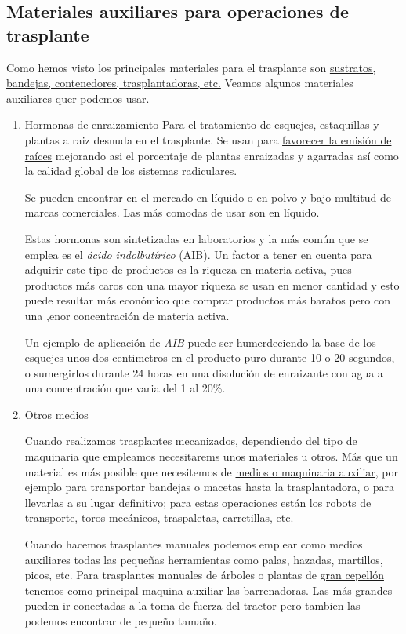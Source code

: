 \documentclass[a4paper,12pt,oneside]{article}
\begin{document}
\subsection{Materiales auxiliares para operaciones de trasplante}
\label{sec:orgb35c02e}

Como  hemos visto los principales materiales para el trasplante son
\uline{sustratos, bandejas, contenedores, trasplantadoras, etc.} Veamos algunos
materiales auxiliares quer podemos usar.

\begin{enumerate}
\item Hormonas de enraizamiento
\label{sec:org4a5f7c5}
Para el tratamiento de esquejes, estaquillas y plantas a raiz desnuda en el
trasplante. Se usan para \uline{favorecer la emisión de raíces} mejorando asi el
porcentaje de plantas enraizadas y agarradas así como la calidad global de los
sistemas radiculares.

Se pueden encontrar en el mercado en líquido o en polvo y bajo multitud de
marcas comerciales. Las más comodas de usar son en líquido.

Estas hormonas son sintetizadas en laboratorios y la más común que se emplea es
el \emph{ácido indolbutírico} (AIB). Un factor a tener en cuenta para adquirir este
tipo de productos es la \uline{riqueza en materia activa}, pues productos más caros
con una mayor riqueza se usan en menor cantidad y esto puede resultar más
económico que comprar productos más baratos pero con una ,enor concentración de
materia activa.

Un ejemplo de aplicación de \emph{AIB} puede ser humerdeciendo la base de los
esquejes unos dos centimetros en el producto puro durante 10 o 20 segundos, o
sumergirlos durante 24 horas en una disolución de enraizante con agua a una
concentración que varia del 1 al 20\%.

\item Otros medios
\label{sec:org9211a6b}

Cuando realizamos trasplantes mecanizados, dependiendo del tipo de maquinaria
que empleamos necesitarems unos materiales u otros. Más que un material es más
posible que necesitemos de \uline{medios o maquinaria auxiliar}, por ejemplo para
transportar bandejas o macetas hasta la trasplantadora, o para llevarlas a su
lugar definitivo; para estas operaciones están los robots de transporte, toros
mecánicos, traspaletas, carretillas, etc.

Cuando hacemos trasplantes manuales podemos emplear como medios auxiliares todas
las pequeñas herramientas como palas, hazadas, martillos, picos, etc. Para
trasplantes manuales de árboles o plantas de \uline{gran cepellón} tenemos como
principal  maquina auxiliar las \uline{barrenadoras}. Las más grandes pueden ir
conectadas a la toma de fuerza del tractor pero tambien las podemos encontrar de
pequeño tamaño.


\end{enumerate}
\end{document}
